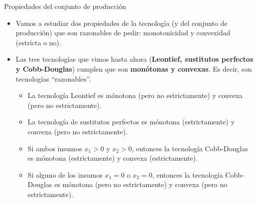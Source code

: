 \documentclass{beamer}
\theoremstyle{definition}
\begin{document}
\begin{frame}{Propiedades del conjunto de producción}

\begin{itemize}
    \item Vamos a estudiar dos propiedades de la tecnología (y del conjunto de producción) que son razonables de pedir: monotonicidad y convexidad (estricta o no).

\item Las tres tecnologías que vimos hasta ahora (\textbf{Leontief, sustitutos perfectos y Cobb-Douglas}) cumplen que son \textbf{monótonas y convexas}. Es decir, son tecnologías ``razonables''.

\begin{itemize}
    \item La tecnología Leontief es mónotona (pero no estrictamente) y convexa (pero no estrictamente).
    \item La tecnología de sustitutos perfectos es mónotona (estrictamente) y convexa (pero no estrictamente).
    \item Si ambos insumos $x_1>0$ y $x_2>0$, entonces la tecnología Cobb-Douglas es mónotona (estrictamente) y convexa (estrictamente).
    \item Si alguno de los insumos $x_1=0$ o $x_2=0$, entonces la tecnología Cobb-Douglas es mónotona (pero no estrictamente) y convexa (pero no estrictamente).
\end{itemize}

  \end{itemize}  
\end{frame}
\end{document}
